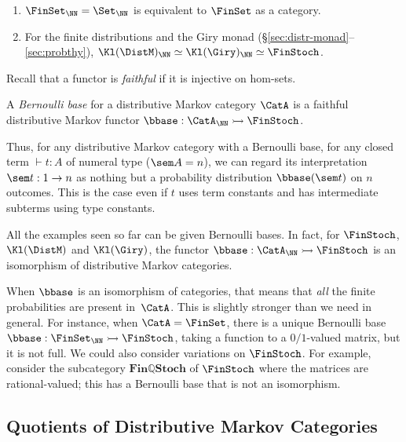 \begin{example}\label{ex:bernoulli-base}\begin{enumerate}
  \item $\FinSet_\NN = \Set_\NN$ is equivalent to $\FinSet$ as a category.
  \item For the finite distributions and the Giry monad (\S\ref{sec:distr-monad}--\ref{sec:probthy}), $\Kl(\DistM)_\NN\simeq \Kl(\Giry)_\NN\simeq \FinStoch$.\end{enumerate}
\end{example}

Recall that a functor is \emph{faithful} if it is injective on hom-sets.
\newcommand{\faithfulfr}{\rightarrowtail}
\begin{definition}
  A \emph{Bernoulli base} for a distributive Markov category $\CatA$
  is a faithful distributive Markov functor $\bbase:\CatA_\NN\faithfulfr \FinStoch$.
\end{definition}
Thus, for any distributive Markov category with a Bernoulli base, 
for any closed term $\vdash t : A$ of numeral type ($\sem A=n$), we
can regard its interpretation $\sem t:1\to n$ as nothing but 
a probability distribution $\bbase(\sem t)$ on $n$ outcomes. This is the case even if
$t$ uses term constants and has intermediate subterms using type
constants. 

\begin{example}
  All the examples seen so far can be given Bernoulli bases. In fact, for $\FinStoch$, $\Kl(\DistM)$ and $\Kl(\Giry)$,
  the functor $\bbase:\CatA_\NN\faithfulfr \FinStoch$ is an isomorphism of distributive Markov categories.
\end{example}
When $\bbase$ is an isomorphism of categories, that means that \emph{all} the finite probabilities are present in~$\CatA$. This is slightly stronger than we need in general. 
For instance, when $\CatA=\FinSet$, there is a unique Bernoulli base $\bbase:\FinSet_\NN\faithfulfr\FinStoch$, taking a function to a $0/1$-valued matrix,
but it is not full.
We could also consider variations on $\FinStoch$. For example,
consider the subcategory $\mathbf{Fin\mathbb{Q}Stoch}$ of $\FinStoch$ where the matrices are rational-valued;
this has a Bernoulli base that is not an isomorphism.

\subsection{Quotients of Distributive Markov Categories}\label{sec:quotients}
\newcommand{\Ctx}{\mathcal{C}}

